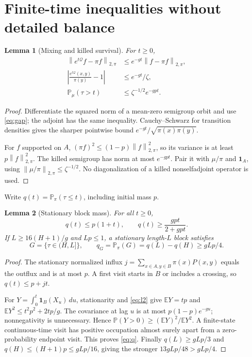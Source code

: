 \documentclass[10pt,a4paper]{article}
\newtheorem{lemma}{Lemma}
\newcommand{\E}{\mathbb E}
\newcommand{\Prb}{\mathbb P}
\newcommand{\one}{\mathbf 1}
\newcommand{\norm}[1]{\left\lVert#1\right\rVert}
\begin{document}
\section{Finite-time inequalities without detailed balance}
\begin{lemma}[Mixing and killed survival]\label{lem:mix}
For $t\ge0$,
\begin{align}
\norm{e^{t\mathcal Q}f-\pi f}_{2,\pi}
&\le e^{-gt}\norm{f-\pi f}_{2,\pi}, \label{eq:l2}\\
\left|\frac{e^{t\mathcal Q}(x,y)}{\pi(y)}-1\right|
&\le e^{-gt}/\zeta, \label{eq:pointmix}\\
\Prb_\mu(\tau>t)&\le\zeta^{-1/2}e^{-gpt}. \label{eq:killed}
\end{align}
\end{lemma}
\begin{proof}
Differentiate the squared norm of a mean-zero semigroup orbit and use \eqref{eq:gap}; the adjoint has the same inequality. Cauchy--Schwarz for transition densities gives the sharper pointwise bound $e^{-gt}/\sqrt{\pi(x)\pi(y)}$.

For $f$ supported on $A$, $(\pi f)^2\le(1-p)\norm f_{2,\pi}^2$, so its variance is at least $p\norm f_{2,\pi}^2$. The killed semigroup has norm at most $e^{-gpt}$. Pair it with $\mu/\pi$ and $\one_A$, using $\norm{\mu/\pi}_{2,\pi}\le\zeta^{-1/2}$. No diagonalization of a killed nonselfadjoint operator is used.
\end{proof}

Write $q(t)=\Prb_\pi(\tau\le t)$, including initial mass $p$.
\begin{lemma}[Stationary block mass]\label{lem:mass}
For all $t\ge0$,
\begin{equation}
q(t)\le p(1+t),\qquad q(t)\ge\frac{gpt}{2+gpt}. \label{eq:q}
\end{equation}
If $L\ge16(H+1)/g$ and $Lp\le1$, a stationary length-$L$ block satisfies
\begin{equation}
G=\{\tau\in(H,L]\},\qquad q_G=\Prb_\pi(G)=q(L)-q(H)\ge gLp/4. \label{eq:qg}
\end{equation}
\end{lemma}
\begin{proof}
The stationary normalized influx $j=\sum_{x\in A,y\in B}\pi(x)P(x,y)$ equals the outflux and is at most $p$. A first visit starts in $B$ or includes a crossing, so $q(t)\le p+jt$.

For $Y=\int_0^t\one_B(X_u)\,du$, stationarity and \eqref{eq:l2} give $\E Y=tp$ and $\E Y^2\le t^2p^2+2tp/g$. The covariance at lag $u$ is at most $p(1-p)e^{-gu}$; nonnegativity is unnecessary. Hence $\Prb(Y>0)\ge(\E Y)^2/\E Y^2$. A finite-state continuous-time visit has positive occupation almost surely apart from a zero-probability endpoint visit. This proves \eqref{eq:q}. Finally $q(L)\ge gLp/3$ and $q(H)\le(H+1)p\le gLp/16$, giving the stronger $13gLp/48>gLp/4$.
\end{proof}
\end{document}
